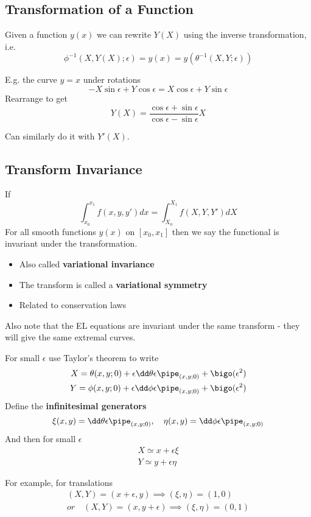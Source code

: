 \documentclass{E:/Documents/Latex/myassignment}
\begin{document}
\subsection{Transformation of a Function}

Given a function $y(x)$ we can rewrite $Y(X)$ using the inverse transformation, i.e.
\[\phi^{-1} (X,Y(X); \epsilon) = y(x) = y(\theta^{-1} (X,Y; \epsilon))\]

E.g. the curve $y=x$ under rotations
\[-X\sin \epsilon + Y \cos \epsilon = X \cos \epsilon + Y \sin \epsilon\]
Rearrange to get
\[Y(X) = \frac{\cos \epsilon + \sin \epsilon}{\cos \epsilon - \sin \epsilon} X\]

Can similarly do it with $Y'(X)$.

\subsection{Transform Invariance}
If
\[\int_{x_0}^{x_1} f(x,y,y') dx = \int_{X_0}^{X_1} f(X,Y,Y') dX\]
For all smooth functions $y(x)$ on $[x_0,x_1]$ then we say the functional is invariant under the transformation.
\begin{itemize}
	\item Also called \textbf{variational invariance}
	\item The transform is called a \textbf{variational symmetry}
	\item Related to conservation laws
\end{itemize}
Also note that the EL equations are invariant under the same transform - they will give the same extremal curves.


For small $\epsilon$ use Taylor's theorem to write
\begin{align*}
	X = \theta(x,y;0) + \epsilon \dd \theta \epsilon\pipe_{(x,y;0)} + \bigo(\epsilon^2)\\
	Y = \phi(x,y;0) + \epsilon \dd \phi \epsilon\pipe_{(x,y;0)} + \bigo(\epsilon^2)\\
\end{align*}
Define the \textbf{infinitesimal generators}
\[\xi(x,y) = \dd \theta \epsilon \pipe_{(x,y;0)}, \quad \eta(x,y) = \dd\phi \epsilon \pipe_{(x,y;0)}\]
And then for small $\epsilon$
\begin{align*}
	X \simeq x + \epsilon \xi\\
	Y \simeq y + \epsilon \eta
\end{align*}

For example, for translations
\begin{align*}
	(X,Y) = (x+\epsilon, y) \implies (\xi, \eta) = (1,0)\\
	or \quad (X,Y) = (x,y+\epsilon) \implies (\xi,\eta) = (0,1)
\end{align*}
\end{document}
